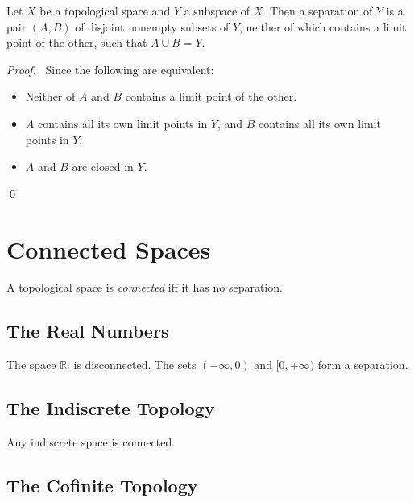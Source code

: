 \begin{prop}
\label{prop:separation_limit_points}
Let $X$ be a topological space and $Y$ a subspace of $X$. Then a separation of $Y$ is a pair $(A,B)$ of disjoint nonempty subsets of $Y$, neither of which contains a limit point of the other, such that $A \cup B = Y$.
\end{prop}

\begin{proof}
\pf\ Since the following are equivalent:
\begin{itemize}
\item Neither of $A$ and $B$ contains a limit point of the other.
\item $A$ contains all its own limit points in $Y$, and $B$ contains all its own limit points in $Y$.
\item $A$ and $B$ are closed in $Y$.
\end{itemize}
\qed
\end{proof}

\section{Connected Spaces}

\begin{df}[Connected]
A topological space is \emph{connected} iff it has no separation.
\end{df}

\subsection{The Real Numbers}

\begin{ex}
The space $\mathbb{R}_l$ is disconnected. The sets $(-\infty, 0)$ and $[0, +\infty)$ form a separation.
\end{ex}

\subsection{The Indiscrete Topology}

\begin{ex}
Any indiscrete space is connected.
\end{ex}

\subsection{The Cofinite Topology}

